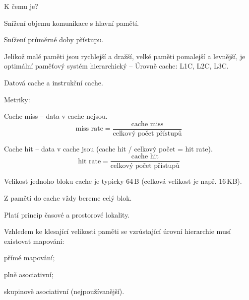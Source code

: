 \begin{compactitem}
    \item K čemu je? \begin{compactitem}
        \item Snížení objemu komunikace s hlavní pamětí.
        \item Snížení průměrné doby přístupu.
    \end{compactitem}

    \item Jelikož malé paměti jsou rychlejší a dražší, velké paměti pomalejší a levnější, je optimální paměťový systém hierarchický -- Úrovně cache: L1C, L2C, L3C.

    \item Datová cache a instrukční cache.

    \item Metriky: \begin{compactitem}
        \item Cache miss -- data v cache nejsou.
        $$ \text{miss rate} = \frac{\text{cache miss}}{\text{celkový počet přístupů}} $$

        \item Cache hit -- data v cache jsou (cache hit / celkový počet = hit rate).
        $$ \text{hit rate} = \frac{\text{cache hit}}{\text{celkový počet přístupů}} $$
    \end{compactitem}

    \item Velikost jednoho bloku cache je typicky 64\,B (celková velikost je např. 16\,KB). \begin{compactitem}
        \item Z paměti do cache vždy bereme celý blok.
    \end{compactitem}

    \item Platí princip časové a prostorové lokality.

    \item Vzhledem ke klesající velikosti paměti se vzrůstající úrovní hierarchie musí existovat mapování: \begin{compactitem}
        \item přímé mapování;
        \item plně asociativní;
        \item skupinově asociativní (nejpoužívanější).
    \end{compactitem}


\end{compactitem}
